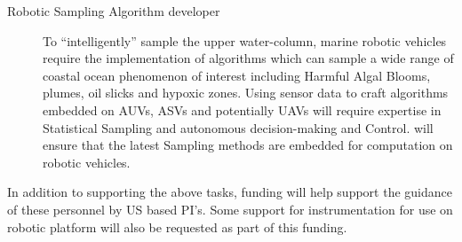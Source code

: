 \begin{description}
\item[Robotic Sampling Algorithm developer] To ``intelligently'' sample
  the upper water-column, marine robotic vehicles require the
  implementation of algorithms which can sample a wide range of coastal
  ocean phenomenon of interest including Harmful Algal Blooms, plumes,
  oil slicks and hypoxic zones. Using sensor data to craft algorithms
  embedded on AUVs, ASVs and potentially UAVs will require expertise in
  Statistical Sampling and autonomous decision-making and Control. \pro
  will ensure that the latest Sampling methods are embedded for
  computation on robotic vehicles.

\end{description}

\noindent
In addition to supporting the above tasks, \kck funding will help
support the guidance of these personnel by US based PI's. Some support
for instrumentation for use on robotic platform will also be requested
as part of this funding.



